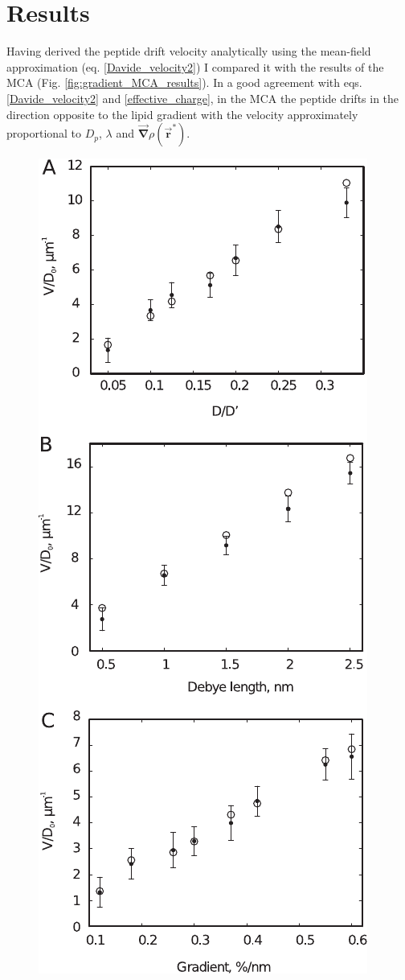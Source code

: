 \section{Results}

Having derived the peptide drift velocity analytically using the mean-field approximation (eq. \eqref{Davide_velocity2}) I compared it with the results of the MCA (Fig. \ref{fig:gradient_MCA_results}). In a good agreement with eqs. \eqref{Davide_velocity2} and \eqref{effective_charge}, in the MCA the peptide drifts in the direction opposite to the lipid gradient with the velocity approximately proportional to $D_p$, $\lambda$ and $\vec{\mathbf{\nabla}}\rho(\vec{\mathbf{r}}^*)$.
\begin{figure}[!ht]
\begin{center}
  \includegraphics[scale=1.12]{../figures/gradient_MCA_results.pdf}

\end{center}
\end{figure}
